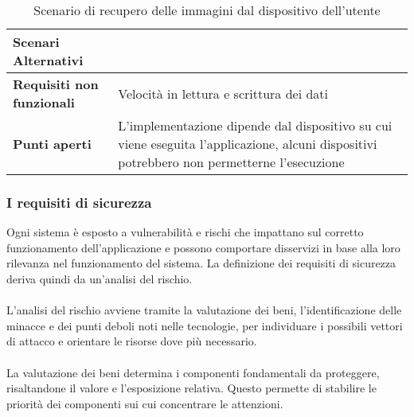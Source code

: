 \begin{table}[htb]
\begin{tabular} {|P{4.5cm}|P{11cm}|}
        \hline
        \textbf{Scenari Alternativi}      &                                                                                                                                            \\
        \hline
        \textbf{Requisiti non funzionali} & Velocità in lettura e scrittura dei dati                                                                                                   \\
        \hline
        \textbf{Punti aperti}             & L'implementazione dipende dal dispositivo su cui viene eseguita l'applicazione, alcuni dispositivi potrebbero non permetterne l'esecuzione \\
        \hline
    \end{tabular}


    \caption{Scenario di recupero delle immagini dal dispositivo dell'utente}
\end{table}

\clearpage
\subsubsection{I requisiti di sicurezza}

Ogni sistema è esposto a vulnerabilità e rischi che impattano sul corretto funzionamento dell'applicazione
 e possono comportare disservizi in base alla loro rilevanza nel funzionamento del sistema.
La definizione dei requisiti di sicurezza deriva quindi da un'analisi del rischio.\\
\\
L'analisi del rischio avviene tramite la valutazione dei beni, l'identificazione delle minacce e dei punti deboli noti nelle tecnologie,
per individuare i possibili vettori di attacco e orientare le risorse dove più necessario.\\
\\
La valutazione dei beni determina i componenti fondamentali da proteggere,
risaltandone il valore e l'esposizione relativa.
Questo permette di stabilire le priorità dei componenti sui cui concentrare le attenzioni.\\
\\

